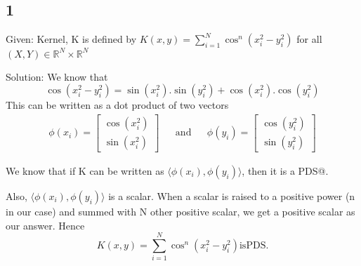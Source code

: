 \documentclass{article}
\begin{document}
\subsection*{1}
\begin{description}
  \item{Given:} Kernel, K is defined by \(K(x,y) = \sum_{i=1}^{N} \cos^{n} (x_{i}^{2} - y_{i}^{2} )\) for all \((X, Y) \in \mathbb{R}^{N} \times \mathbb{R}^{N} \) 
  \item{Solution:}  We know that
    \begin{equation}
      \cos (x_{i}^{2} - y_{i}^{2}) = \sin (x_{i}^{2}).\sin (y_{i}^{2}) + \cos (x_{i}^{2}).\cos (y_{i}^{2})
    \end{equation}
    This can be written as a dot product of two vectors 
    \begin{align}
    \phi(x_{i}) = \begin{bmatrix} \cos (x_{i}^{2}) \\ \sin (x_{i}^{2}) \end{bmatrix} && \mathrm{and} &&
    \phi(y_{i}) = \begin{bmatrix} \cos (y_{i}^{2}) \\ \sin (y_{i}^{2}) \end{bmatrix}
    \end{align}

    We know that if K can be written as \( \langle \phi(x_{i}), \phi(y_{i}) \rangle \), then it is a PDS@.

    Also, \( \langle \phi(x_{i}), \phi(y_{i}) \rangle \) is a scalar.  When a scalar is raised to a positive power (n in our case) and summed with N other positive scalar, we get a positive scalar as our answer.  Hence
    \begin{equation*}
      K(x,y) = \sum_{i=1}^{N} \cos^{n} (x_{i}^{2} - y_{i}^{2} ) \mathrm{is PDS.}
    \end{equation*}
\end{description}
\end{document}
